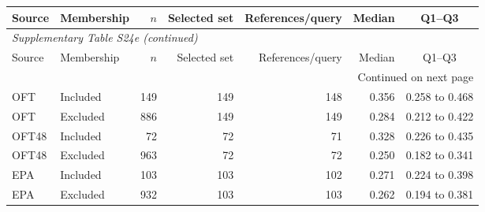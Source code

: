 \begingroup\footnotesize\setlength{\tabcolsep}{4pt}

\begin{longtable}{llrrrrc}

\toprule Source & Membership & $n$ & Selected set & References/query & Median & Q1--Q3 \\ \midrule\endfirsthead

\multicolumn{7}{l}{\textit{Supplementary Table S24e (continued)}} \\

\toprule Source & Membership & $n$ & Selected set & References/query & Median & Q1--Q3 \\ \midrule\endhead

\midrule\multicolumn{7}{r}{Continued on next page}\\\endfoot\bottomrule\endlastfoot

OFT & Included & 149 & 149 & 148 & 0.356 & 0.258 to 0.468 \\

OFT & Excluded & 886 & 149 & 149 & 0.284 & 0.212 to 0.422 \\

OFT48 & Included & 72 & 72 & 71 & 0.328 & 0.226 to 0.435 \\

OFT48 & Excluded & 963 & 72 & 72 & 0.250 & 0.182 to 0.341 \\

EPA & Included & 103 & 103 & 102 & 0.271 & 0.224 to 0.398 \\

EPA & Excluded & 932 & 103 & 103 & 0.262 & 0.194 to 0.381 \\

\end{longtable}\endgroup
